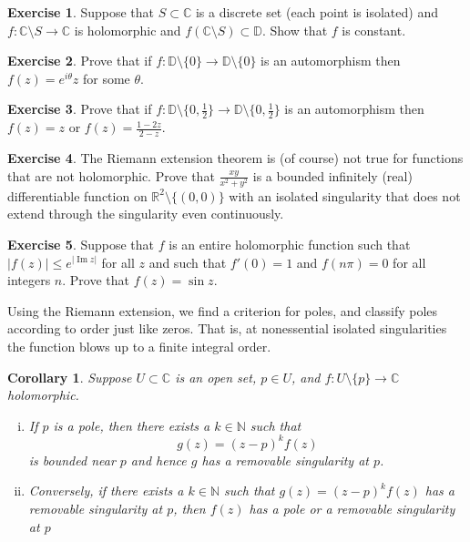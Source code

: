 \documentclass[12pt,openany]{book}
\renewcommand{\Im}{\operatorname{Im}}
\newcommand{\sabs}[1]{\lvert {#1} \rvert}
\newcommand{\C}{{\mathbb{C}}}
\newcommand{\R}{{\mathbb{R}}}
\newcommand{\N}{{\mathbb{N}}}
\newcommand{\D}{{\mathbb{D}}}
\theoremstyle{plain}
\newtheorem{cor}[thm]{Corollary}
\theoremstyle{remark}
\theoremstyle{definition}
\newenvironment{exbox}{%
    \def\FrameCommand{\vrule width 1pt \relax\hspace{10pt}}%
    \MakeFramed{\advance\hsize-\width\FrameRestore}%
}{%
    \endMakeFramed
}
\theoremstyle{exercise}
\newtheorem{exercise}{Exercise}[section]
\theoremstyle{example}
\begin{document}
\begin{exbox}
\begin{exercise}
Suppose that $S \subset \C$ is a discrete set (each point is isolated) and
$f \colon \C \setminus S \to \C$ is holomorphic and $f(\C \setminus S)
\subset \D$.  Show that $f$ is constant.
\end{exercise}

\begin{exercise}
Prove that if $f \colon \D \setminus \{ 0 \} \to \D \setminus \{ 0 \}$
is an automorphism then $f(z) = e^{i\theta} z$ for some $\theta$.
\end{exercise}

\begin{exercise}
Prove that if
$f \colon \D \setminus \bigl\{ 0, \frac{1}{2} \bigr\} \to \D \setminus
\bigl\{ 0 , \frac{1}{2} \bigr\}$
is an automorphism then $f(z) = z$ or $f(z) = \frac{1-2z}{2-z}$.
\end{exercise}

\begin{exercise}
The Riemann extension theorem is (of course) not true for functions that are
not holomorphic.  Prove that $\frac{xy}{x^2+y^2}$ is a bounded infinitely 
(real) differentiable function
on $\R^2 \setminus \{ (0,0) \}$ with an isolated singularity that does not
extend through the singularity even continuously.
\end{exercise}

\begin{exercise}
Suppose that $f$ is an entire holomorphic function such that
$\sabs{f(z)} \leq e^{\sabs{\Im z}}$ for all $z$ and such that
$f'(0) =1$ and $f(n\pi) = 0$ for all integers $n$.
Prove that $f(z) = \sin z$.
\end{exercise}
\end{exbox}

Using the Riemann extension, we find a criterion for poles, and classify
poles according to order just like zeros.  That is,
at nonessential isolated singularities
the function blows up to a finite integral order.

\begin{cor}
Suppose $U \subset \C$ is an open set, $p \in U$,
and $f \colon U \setminus \{p\} \to \C$ holomorphic.
\begin{enumerate}[(i)]
\item
If $p$ is a pole, then there exists a $k \in \N$ such that
\begin{equation*}
g(z) = {(z-p)}^k f(z)
\end{equation*}
is bounded near $p$ and hence $g$ has a removable singularity at $p$.
\item
Conversely, if there exists a $k \in \N$ such that
$g(z) = {(z-p)}^k f(z)$ has a removable singularity at $p$,
then $f(z)$ has a pole or a
removable singularity at $p$
\end{enumerate}
\end{cor}
\end{document}
